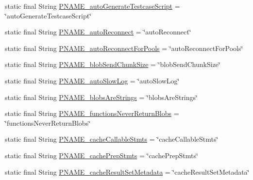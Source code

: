 \begin{DoxyCompactItemize}
\item 
static final String \mbox{\hyperlink{classcom_1_1mysql_1_1cj_1_1conf_1_1_property_definitions_a96991c41e4521168671ca79abc4354bb}{P\+N\+A\+M\+E\+\_\+auto\+Generate\+Testcase\+Script}} = \char`\"{}auto\+Generate\+Testcase\+Script\char`\"{}
\item 
static final String \mbox{\hyperlink{classcom_1_1mysql_1_1cj_1_1conf_1_1_property_definitions_a8397ead57bfb1f84df15217b88d9b9b8}{P\+N\+A\+M\+E\+\_\+auto\+Reconnect}} = \char`\"{}auto\+Reconnect\char`\"{}
\item 
static final String \mbox{\hyperlink{classcom_1_1mysql_1_1cj_1_1conf_1_1_property_definitions_acb67126ce870368616adf3d97df95047}{P\+N\+A\+M\+E\+\_\+auto\+Reconnect\+For\+Pools}} = \char`\"{}auto\+Reconnect\+For\+Pools\char`\"{}
\item 
static final String \mbox{\hyperlink{classcom_1_1mysql_1_1cj_1_1conf_1_1_property_definitions_ac26d6d79ee4782897033246f468263d4}{P\+N\+A\+M\+E\+\_\+blob\+Send\+Chunk\+Size}} = \char`\"{}blob\+Send\+Chunk\+Size\char`\"{}
\item 
static final String \mbox{\hyperlink{classcom_1_1mysql_1_1cj_1_1conf_1_1_property_definitions_a564d59b0940a7498eacad705862e7b7c}{P\+N\+A\+M\+E\+\_\+auto\+Slow\+Log}} = \char`\"{}auto\+Slow\+Log\char`\"{}
\item 
static final String \mbox{\hyperlink{classcom_1_1mysql_1_1cj_1_1conf_1_1_property_definitions_aa28f630fe108b66847f82d4a5cda943e}{P\+N\+A\+M\+E\+\_\+blobs\+Are\+Strings}} = \char`\"{}blobs\+Are\+Strings\char`\"{}
\item 
static final String \mbox{\hyperlink{classcom_1_1mysql_1_1cj_1_1conf_1_1_property_definitions_a8d9cf04fa7d305d5f658b015229a9219}{P\+N\+A\+M\+E\+\_\+functions\+Never\+Return\+Blobs}} = \char`\"{}functions\+Never\+Return\+Blobs\char`\"{}
\item 
static final String \mbox{\hyperlink{classcom_1_1mysql_1_1cj_1_1conf_1_1_property_definitions_aef6806c452cecba607f993d926dd99ed}{P\+N\+A\+M\+E\+\_\+cache\+Callable\+Stmts}} = \char`\"{}cache\+Callable\+Stmts\char`\"{}
\item 
static final String \mbox{\hyperlink{classcom_1_1mysql_1_1cj_1_1conf_1_1_property_definitions_a30d51d6f72cd1b284f53b95b40937feb}{P\+N\+A\+M\+E\+\_\+cache\+Prep\+Stmts}} = \char`\"{}cache\+Prep\+Stmts\char`\"{}
\item 
static final String \mbox{\hyperlink{classcom_1_1mysql_1_1cj_1_1conf_1_1_property_definitions_a324129a30cc11128fe5597e7513b22e7}{P\+N\+A\+M\+E\+\_\+cache\+Result\+Set\+Metadata}} = \char`\"{}cache\+Result\+Set\+Metadata\char`\"{}

\end{DoxyCompactItemize}
